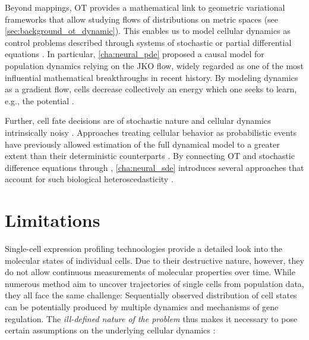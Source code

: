 Beyond mappings, OT provides a mathematical link to geometric variational frameworks that allow studying flows of distributions on metric spaces (see \cref{sec:background_ot_dynamic}).
This enables us to model cellular dynamics as control problems described through systems of stochastic \citep[\cref{cha:neural_sde}]{bunne2022recovering, somnath2023aligned} or partial differential equations \citep[\cref{cha:neural_pde}]{bunne2022proximal}.
In particular, \cref{cha:neural_pde} proposed a causal model for population dynamics relying on the \acrfull{JKO} flow, widely regarded as one of the most influential mathematical breakthroughs in recent history. By modeling dynamics as a gradient flow, cells decrease collectively an energy which one seeks to learn, e.g., the \citeauthor{waddington1957strategy} potential \citep{bunne2022proximal}. 

Further, cell fate decisions are of stochastic nature and cellular dynamics intrinsically noisy \citep{wilkinson2009stochastic}.
Approaches treating cellular behavior as probabilistic events have previously allowed estimation of the full dynamical model to a greater extent than their deterministic counterparts \citep{bergen2020generalizing}.
By connecting OT and stochastic difference equations through , \cref{cha:neural_sde} introduces several approaches that account for such biological heteroscedasticity \citep{bunne2022recovering, somnath2023aligned}.

\section*{Limitations}

Single-cell expression profiling technoologies provide a detailed look into the molecular states of individual cells. Due to their destructive nature, however, they do not allow continuous measurements of molecular properties over time. While numerous method aim to uncover trajectories of single cells from population data, they all face the same challenge: Sequentially observed distribution of cell states can be potentially produced by multiple dynamics and mechanisms of gene regulation. The \emph{ill-defined nature of the problem} thus makes it necessary to pose certain assumptions on the underlying cellular dynamics \citep{weinreb2018fundamental}:

